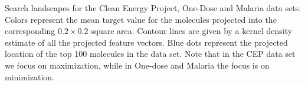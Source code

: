 Search landscapes for the Clean Energy Project, One-Dose and Malaria data sets.  
Colors represent the mean target value for the molecules projected into the corresponding $0.2 \times 0.2$ square area. Contour lines are given by a kernel density estimate of all the projected feature vectors. Blue dots represent the projected location of the top 100 molecules in the data set. Note that in the CEP data set we focus on maximization, while in One-dose and Malaria the focus is on minimization.
\label{fig:info_landscapes}